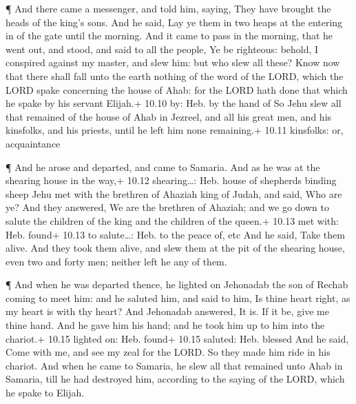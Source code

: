  ¶ And there came a messenger, and told him, saying, They
have brought the heads of the king's sons. And he said, Lay ye them in
two heaps at the entering in of the gate until the morning. 
And it came to pass in the morning, that he went out, and stood, and
said to all the people, Ye be righteous: behold, I conspired against my
master, and slew him: but who slew all these?  Know now
that there shall fall unto the earth nothing of the word of the LORD,
which the LORD spake concerning the house of Ahab: for the LORD hath
done that which he spake by his servant Elijah.+ 10.10 by: Heb. by the
hand of  So Jehu slew all that remained of the house of
Ahab in Jezreel, and all his great men, and his kinsfolks, and his
priests, until he left him none remaining.+ 10.11 kinsfolks: or,
acquaintance

 ¶ And he arose and departed, and came to Samaria. And as
he was at the shearing house in the way,+ 10.12 shearing\ldots: Heb.
house of shepherds binding sheep  Jehu met with the
brethren of Ahaziah king of Judah, and said, Who are ye? And they
answered, We are the brethren of Ahaziah; and we go down to salute the
children of the king and the children of the queen.+ 10.13 met with:
Heb. found+ 10.13 to salute\ldots: Heb. to the peace of, etc
 And he said, Take them alive. And they took them alive,
and slew them at the pit of the shearing house, even two and forty men;
neither left he any of them.

 ¶ And when he was departed thence, he lighted on Jehonadab
the son of Rechab coming to meet him: and he saluted him, and said to
him, Is thine heart right, as my heart is with thy heart? And Jehonadab
answered, It is. If it be, give me thine hand. And he gave him his hand;
and he took him up to him into the chariot.+ 10.15 lighted on: Heb.
found+ 10.15 saluted: Heb. blessed  And he said, Come with
me, and see my zeal for the LORD. So they made him ride in his chariot.
 And when he came to Samaria, he slew all that remained
unto Ahab in Samaria, till he had destroyed him, according to the saying
of the LORD, which he spake to Elijah.

